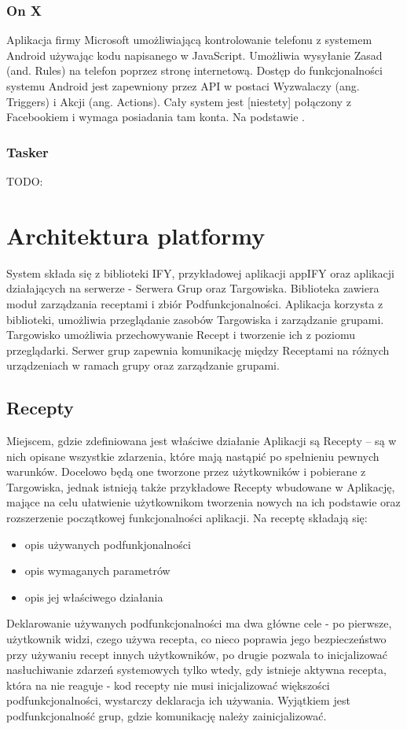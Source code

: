 \documentclass[11pt,a4paper,polish,thesis]{dcsbook}
\begin{document}
\subsection{On X}
Aplikacja firmy Microsoft umożliwiającą kontrolowanie telefonu z systemem Android używając kodu napisanego w JavaScript. Umożliwia wysyłanie Zasad (and. Rules) na
telefon poprzez stronę internetową. Dostęp do funkcjonalności systemu Android jest zapewniony przez API w postaci Wyzwalaczy (ang. Triggers) i Akcji (ang. Actions).
Cały system jest [niestety] połączony z Facebookiem i wymaga posiadania tam konta. Na podstawie \cite{onx}.
\subsection{Tasker}
TODO:

\chapter{Architektura platformy}
System składa się z biblioteki IFY, przykładowej aplikacji appIFY oraz aplikacji działających na serwerze - Serwera Grup oraz Targowiska.
Biblioteka zawiera moduł zarządzania receptami i zbiór Podfunkcjonalności.
Aplikacja korzysta z biblioteki, umożliwia przeglądanie zasobów Targowiska i zarządzanie grupami. 
Targowisko umożliwia przechowywanie Recept i tworzenie ich z poziomu przeglądarki.
Serwer grup zapewnia komunikację między Receptami na różnych urządzeniach w ramach grupy oraz zarządzanie grupami.

\section{Recepty}
Miejscem, gdzie zdefiniowana jest właściwe działanie Aplikacji są Recepty -- są w nich opisane wszystkie zdarzenia, które mają nastąpić po spełnieniu pewnych warunków. Docelowo będą one tworzone przez użytkowników i pobierane z Targowiska, jednak istnieją także przykładowe Recepty wbudowane w Aplikację, mające na celu ułatwienie użytkownikom tworzenia nowych na ich podstawie oraz rozszerzenie początkowej funkcjonalności aplikacji. 
Na receptę składają się:
\begin{itemize}
\item  opis używanych podfunkjonalności
\item  opis wymaganych parametrów
\item  opis jej właściwego działania
\end{itemize}
Deklarowanie używanych podfunkcjonalności ma dwa główne cele - po pierwsze, użytkownik widzi, czego używa recepta, co nieco poprawia jego bezpieczeństwo przy używaniu recept innych użytkowników, po drugie pozwala to inicjalizować nasłuchiwanie zdarzeń systemowych tylko wtedy, gdy istnieje aktywna recepta, która na nie reaguje - kod recepty nie musi inicjalizować większości podfunkcjonalności, wystarczy deklaracja ich używania. Wyjątkiem jest podfunkcjonalność grup, gdzie komunikację należy zainicjalizować.
\end{document}
